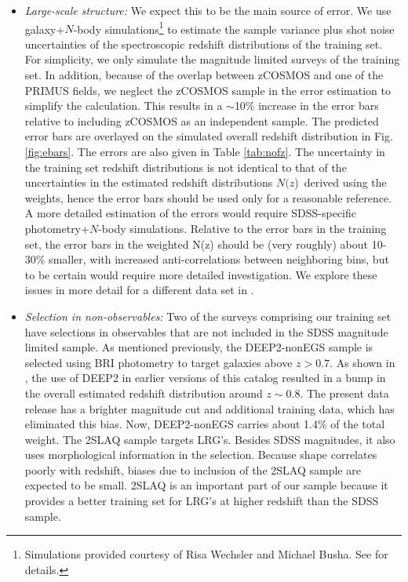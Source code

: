 \documentclass[preprint]{aastex}
\newcommand{\nofz}{$N(z$)}
\begin{document}
\begin{itemize}

\item {\it Large-scale structure: } We expect this to be the main source of
error.  We use galaxy+$N$-body simulations\footnote{Simulations provided courtesy of Risa Wechsler and
Michael Busha. See \cite{bushasimulations} for details.}
 to estimate the sample variance plus shot
noise uncertainties of the spectroscopic redshift distributions of the training
set.  For simplicity, we only simulate the magnitude limited surveys of the
training set.  In addition, because of the overlap between zCOSMOS and one of
the PRIMUS fields, we neglect the zCOSMOS sample in the error estimation to
simplify the calculation.  This results in a $\sim$10\% increase in the error
bars relative to including zCOSMOS as an independent sample.  The predicted
error bars are overlayed on the simulated overall redshift
distribution in Fig.
\ref{fig:ebars}.  The errors are also given in Table \ref{tab:nofz}. The
uncertainty in the training set redshift distributions is not identical to that
of the uncertainties in the estimated redshift distributions \nofz\ derived using
the weights, hence the error bars should be used only for a reasonable
reference.  A more detailed estimation of the errors would require SDSS-specific
photometry+$N$-body simulations.  Relative to the error bars in the
training set, the error bars in the weighted N(z) should be (very roughly)
about 10-30\% smaller, with increased anti-correlations between neighboring
bins, but to be certain would require more detailed investigation.
We explore these issues in more detail for a different data set
in \citet{CunhaPhotozLSS11}.


\item {\it Selection in non-observables: } Two of the surveys comprising our
training set have selections in observables that are not included in the SDSS
magnitude limited sample.  As mentioned previously, the DEEP2-nonEGS sample is
selected using BRI photometry to target galaxies above $z>0.7$.  As shown in
\citet{CunhaPhotoz09}, the use of DEEP2 in earlier versions of this catalog
resulted in a bump in the overall estimated redshift distribution around $z\sim
0.8$.  The present data release has a brighter magnitude cut and additional
training data, which has eliminated this bias.  
Now, DEEP2-nonEGS carries about 1.4\% of the total weight.  The 2SLAQ sample targets
LRG's.  Besides SDSS magnitudes, it also uses morphological information in the
selection.  Because shape correlates poorly with redshift, biases due to inclusion of the
2SLAQ sample are expected to be small.  2SLAQ is an important part of our
sample because it provides a better training set for LRG's at higher redshift
than the SDSS sample.


\end{itemize}
\end{document}
